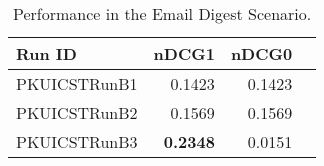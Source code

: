 \begin{table}[htbp]
\centering
\caption{Performance in the Email Digest Scenario.}
\label{tab:resB}
\begin{tabular}{lrrr}
\hline
Run ID&nDCG1&nDCG0\\
\hline
PKUICSTRunB1&0.1423&0.1423\\
PKUICSTRunB2&0.1569&0.1569\\
PKUICSTRunB3&\textbf{0.2348}&0.0151\\
\hline
\end{tabular}
\end{table}


